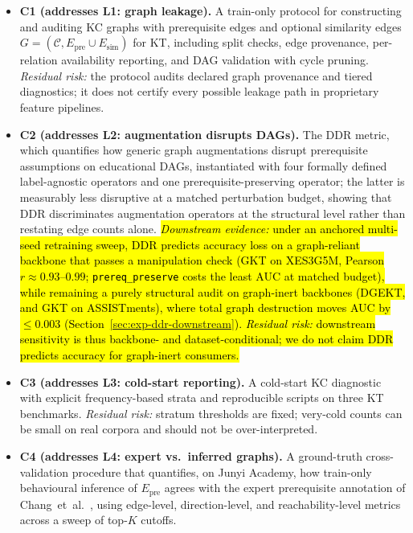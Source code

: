 \documentclass[pdflatex,sn-mathphys-num]{sn-jnl}
\newcommand{\Epre}{\ensuremath{E_{\text{pre}}}}
\newcommand{\Esim}{\ensuremath{E_{\text{sim}}}}
\newcommand{\DDR}{\textsc{DDR}}
\newcommand{\rev}[1]{\hl{#1}}
\newcommand{\rev}[1]{#1}
\begin{document}
\begin{itemize}
  \item \textbf{C1 (addresses L1: graph leakage).} A train-only protocol
  for constructing and auditing KC graphs with prerequisite edges and
  optional similarity edges $G=(\mathcal{C}, \Epre \cup \Esim)$ for KT,
  including split checks, edge provenance, per-relation availability
  reporting, and DAG validation with cycle pruning.
  \emph{Residual risk:} the protocol audits declared graph provenance and
  tiered diagnostics; it does not certify every possible leakage path in
  proprietary feature pipelines.
  \item \textbf{C2 (addresses L2: augmentation disrupts DAGs).} The
  \DDR{} metric, which quantifies how generic graph augmentations disrupt
  prerequisite assumptions on educational DAGs, instantiated with four
  formally defined label-agnostic operators and one prerequisite-preserving
  operator; the latter is measurably less disruptive at a matched
  perturbation budget, showing that \DDR{} discriminates augmentation
  operators at the structural level rather than restating edge counts alone.
  \rev{\emph{Downstream evidence:} under an anchored multi-seed retraining sweep, \DDR{}
  predicts accuracy loss on a graph-reliant backbone that passes a
  manipulation check (GKT on XES3G5M, Pearson \mbox{$r{\approx}0.93$--$0.99$}; \mbox{\texttt{prereq\_preserve}}
  costs the least AUC at matched budget), while remaining a purely structural
  audit on graph-inert backbones (DGEKT, and GKT on ASSISTments), where total
  graph destruction moves AUC by \mbox{${\le}0.003$} (\mbox{Section~\ref{sec:exp-ddr-downstream}}).
  \emph{Residual risk:} downstream sensitivity is thus backbone- and
  dataset-conditional; we do not claim \DDR{} predicts accuracy for graph-inert
  consumers.}
  \item \textbf{C3 (addresses L3: cold-start reporting).} A cold-start KC
  diagnostic with explicit frequency-based strata and reproducible scripts
  on three KT benchmarks.
  \emph{Residual risk:} stratum thresholds are fixed; very-cold counts can
  be small on real corpora and should not be over-interpreted.
  \item \textbf{C4 (addresses L4: expert vs.\ inferred graphs).} A
  ground-truth cross-validation procedure that quantifies, on Junyi
  Academy, how train-only behavioural inference of $\Epre$ agrees with the
  expert prerequisite annotation of Chang~et~al.~\cite{junyi_dataset},
  using edge-level, direction-level, and reachability-level metrics across
  a sweep of top-$K$ cutoffs.

\end{itemize}
\end{document}
